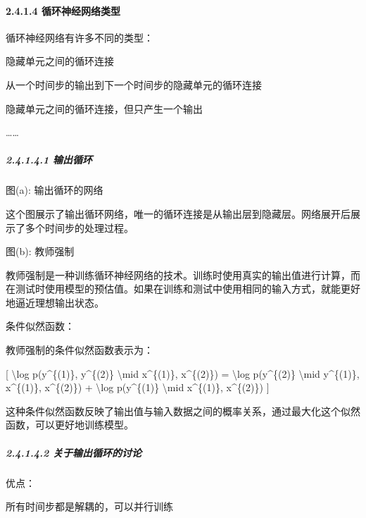\paragraph{\texorpdfstring{\textbf{2.4.1.4
循环神经网络类型}}{2.4.1.4 循环神经网络类型}}\label{2414-ux5faaux73afux795eux7ecfux7f51ux7edcux7c7bux578b}

循环神经网络有许多不同的类型：

隐藏单元之间的循环连接

从一个时间步的输出到下一个时间步的隐藏单元的循环连接

隐藏单元之间的循环连接，但只产生一个输出

\ldots\ldots{}

\subparagraph{\texorpdfstring{\textbf{2.4.1.4.1
输出循环}}{2.4.1.4.1 输出循环}}\label{24141-ux8f93ux51faux5faaux73af}


图(a): 输出循环的网络

这个图展示了输出循环网络，唯一的循环连接是从输出层到隐藏层。网络展开后展示了多个时间步的处理过程。

图(b): 教师强制

教师强制是一种训练循环神经网络的技术。训练时使用真实的输出值进行计算，而在测试时使用模型的预估值。如果在训练和测试中使用相同的输入方式，就能更好地逼近理想输出状态。

条件似然函数：

教师强制的条件似然函数表示为：

{[} \textbackslash log p(y\^{}\{(1)\}, y\^{}\{(2)\} \textbackslash mid
x\^{}\{(1)\}, x\^{}\{(2)\}) = \textbackslash log p(y\^{}\{(2)\}
\textbackslash mid y\^{}\{(1)\}, x\^{}\{(1)\}, x\^{}\{(2)\}) +
\textbackslash log p(y\^{}\{(1)\} \textbackslash mid x\^{}\{(1)\},
x\^{}\{(2)\}) {]}


这种条件似然函数反映了输出值与输入数据之间的概率关系，通过最大化这个似然函数，可以更好地训练模型。

\subparagraph{\texorpdfstring{\textbf{2.4.1.4.2
关于输出循环的讨论}}{2.4.1.4.2 关于输出循环的讨论}}\label{24142-ux5173ux4e8eux8f93ux51faux5faaux73afux7684ux8ba8ux8bba}

优点：

所有时间步都是解耦的，可以并行训练

